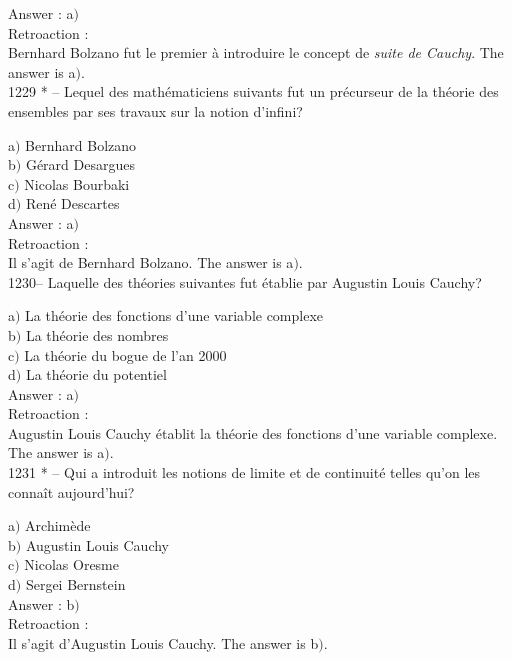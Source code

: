 ﻿\documentclass[letterpaper, 12pt]{article}
\begin{document}
Answer : a$)$\\

Retroaction : \\
Bernhard Bolzano fut le premier \`a introduire le concept de {\sl
suite de Cauchy}.
The answer is a$)$.\\

1229 * -- Lequel des math\'ematiciens suivants fut un pr\'ecurseur
de la th\'eorie des ensembles par ses travaux sur la notion
d'infini?

a$)$ Bernhard Bolzano \\
b$)$ G\'erard Desargues \\
c$)$ Nicolas Bourbaki \\
d$)$ Ren\'e Descartes\\

Answer : a$)$\\

Retroaction : \\
Il s'agit de Bernhard Bolzano.
The answer is a$)$.\\

1230-- Laquelle des th\'eories suivantes fut \'etablie par Augustin
Louis Cauchy?

a$)$ La th\'eorie des fonctions d'une variable complexe \\
b$)$ La th\'eorie des nombres \\
c$)$ La th\'eorie du bogue de l'an 2000 \\
d$)$ La th\'eorie du potentiel\\

Answer : a$)$\\

Retroaction : \\
Augustin Louis Cauchy \'etablit la th\'eorie des fonctions d'une
variable complexe.
The answer is a$)$.\\

1231 * -- Qui a introduit les notions de limite et de continuit\'e
telles qu'on les conna\^it aujourd'hui?

a$)$ Archim\`ede \\
b$)$ Augustin Louis Cauchy \\
c$)$ Nicolas Oresme \\
d$)$ Sergei Bernstein\\

Answer : b$)$\\

Retroaction : \\
Il s'agit d'Augustin Louis Cauchy.
The answer is b$)$.\\
\end{document}
